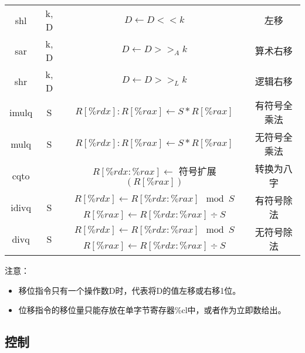 \begin{table}[H]
\begin{tabular}{|c c|c|c|}
        shl                               & k, D               & $D \leftarrow D << k$                        & 左移                     \\
        sar                               & k, D               & $D \leftarrow D >>_A k$                      & 算术右移                   \\
        shr                               & k, D               & $D \leftarrow D >>_L k$                      & 逻辑右移                   \\
        \hline
        imulq                             & S                  & $R[\%rdx]:R[\%rax] \leftarrow S * R[\%rax]$  & 有符号全乘法                 \\
        mulq                              & S                  & $R[\%rdx]:R[\%rax] \leftarrow S * R[\%rax]$  & 无符号全乘法                 \\
        \hline
        cqto                              &                    & $R[\%rdx:\%rax] \leftarrow$ 符号扩展$(R[\%rax])$ & 转换为八字                  \\
        \hline
        \multirow{2}{*}{idivq}            & \multirow{2}{*}{S} & $R[\%rdx] \leftarrow R[\%rdx:\%rax] \mod S$  & \multirow{2}{*}{有符号除法} \\
                                          &                    & $R[\%rax] \leftarrow R[\%rdx:\%rax] \div S$  &                        \\
        \hline
        \multirow{2}{*}{divq}             & \multirow{2}{*}{S} & $R[\%rdx] \leftarrow R[\%rdx:\%rax] \mod S$  & \multirow{2}{*}{无符号除法} \\
                                          &                    & $R[\%rax] \leftarrow R[\%rdx:\%rax] \div S$  &                        \\
        \hline
    \end{tabular}
\end{table}

注意：
\begin{itemize}
    \item 移位指令只有一个操作数D时，代表将D的值左移或右移1位。
    \item 位移指令的移位量只能存放在单字节寄存器\%cl中，或者作为立即数给出。
\end{itemize}

\subsection{控制}
